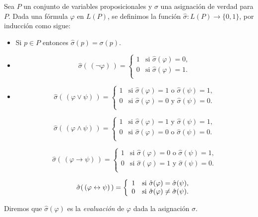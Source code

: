 \begin{definicion}
Sea $P$ un conjunto de variables proposicionales y $\sigma$ una asignaci\'on de verdad para $P$.
Dada una f\'ormula $\varphi$ en $L(P)$, se definimos la funci\'on $\hat\sigma:L(P)\to \{0,1\}$, 
por inducci\'on como sigue:
\begin{itemize}
\item Si $p\in P$ entonces $\hat\sigma(p)=\sigma(p)$.
\item \[\hat\sigma(\, (\neg \varphi)\, )= 
      \left\{ 
      \begin{array}{cl}
      1 & \text{si }\hat\sigma(\varphi)=0, \\
      0 & \text{si }\hat\sigma(\varphi)=1. \\
      \end{array}
      \right.
\]
\item
\[\hat\sigma(\, (\varphi \vee \psi)\, )= 
      \left\{ 
      \begin{array}{cl}
      1 & \text{si }\hat\sigma(\varphi)=1\text{ o }\hat\sigma(\psi)=1, \\
      0 & \text{si }\hat\sigma(\varphi)=0\text{ y }\hat\sigma(\psi)=0. \\
      \end{array}
      \right.
\]

\[\hat\sigma(\, (\varphi \wedge \psi)\, )= 
      \left\{ 
      \begin{array}{cl}
      1 & \text{si }\hat\sigma(\varphi)=1\text{ y }\hat\sigma(\psi)=1, \\
      0 & \text{si }\hat\sigma(\varphi)=0\text{ o }\hat\sigma(\psi)=0. \\
      \end{array}
      \right.
\]

\[\hat\sigma(\, (\varphi \to \psi)\, )= 
      \left\{ 
      \begin{array}{cl}
      1 & \text{si }\hat\sigma(\varphi)=0\text{ o }\hat\sigma(\psi)=1, \\
      0 & \text{si }\hat\sigma(\varphi)=1\text{ y }\hat\sigma(\psi)=0. \\
      \end{array}
      \right.
\]

\[\hat\sigma(\, (\varphi \leftrightarrow \psi)\, )= 
      \left\{ 
      \begin{array}{cl}
      1 & \text{si }\hat\sigma(\varphi)=\hat\sigma(\psi), \\
      0 & \text{si }\hat\sigma(\varphi)\neq\hat\sigma(\psi). \\
      \end{array}
      \right.
\]
\end{itemize}
Diremos que $\hat\sigma(\varphi)$ es la {\em evaluaci\'on} de $\varphi$ dada la 
asignaci\'on $\sigma$.
\end{definicion}

